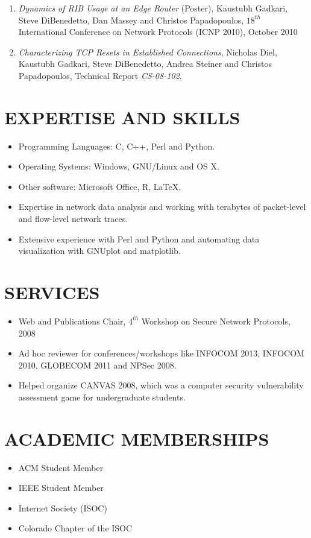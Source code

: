\documentclass[line,margin]{res}
\begin{document}
\begin{resume}
\begin{enumerate}
              \item {\sl Dynamics of RIB Usage at an Edge Router} (Poster), Kaustubh Gadkari, Steve DiBenedetto,
               Dan Massey and Christos Papadopoulos, ${18^{th}}$ International Conference on Network Protocols (ICNP 2010), October 2010

               \item {\sl Characterizing TCP Resets in Established Connections}, Nicholas Diel, Kaustubh Gadkari, Steve DiBenedetto,
              Andrea Steiner and Christos Papadopoulos,
              Technical Report {\emph {CS-08-102}}.
             \end{enumerate}

\section{EXPERTISE AND SKILLS}
	\begin{itemize}
		\item Programming Languages: C, C++, Perl and Python.
		\item Operating Systems: Windows, GNU/Linux and OS X.
		\item Other software: Microsoft Office, R, LaTeX.
		\item Expertise in network data analysis and working with terabytes of packet-level and flow-level network traces.
		\item Extensive experience with Perl and Python and automating data
			visualization with GNUplot and matplotlib.
	\end{itemize}

\section{SERVICES}
	\begin{itemize}
                \item Web and Publications Chair, $4^{th}$ Workshop on Secure Network Protocols, 2008
                \item Ad hoc reviewer for conferences/workshops like INFOCOM 2013, INFOCOM 2010, GLOBECOM 2011 and NPSec 2008.
                \item Helped organize CANVAS 2008, which was a computer security vulnerability assessment game for undergraduate students.
         \end{itemize}



\section{ACADEMIC MEMBERSHIPS}
	\begin{itemize}
		\item ACM Student Member
		\item IEEE Student Member
		\item Internet Society (ISOC)
		\item Colorado Chapter of the ISOC
	\end{itemize}


\end{resume}
\end{document}
